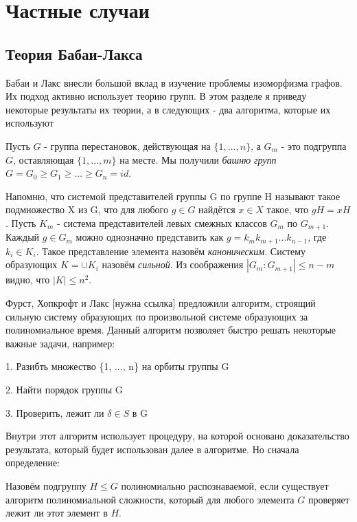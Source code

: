 \section{Частные случаи}





\subsection{Теория Бабаи-Лакса}
Бабаи и Лакс внесли большой вклад в изучение проблемы изоморфизма графов. Их подход активно использует теорию групп. В этом разделе я приведу некоторые результаты их теории, а в следующих - два алгоритма, которые их используют

Пусть $G$ - группа перестановок, действующая на $\{1, ..., n\}$, а $G_m$ - это подгруппа $G$, оставляющая $\{1, ..., m\}$ на месте. Мы получили \textit{башню групп} 
$G = G_0 \geqslant G_1 \geqslant ... \geqslant G_n = id$.

Напомню, что системой представителей группы G по группе H называют такое подмножество X из G, что для любого $g \in G$ найдётся $x \in X$ такое, что $gH = xH$. Пусть $K_m$ - система представителей левых смежных классов $G_m$ по $G_{m+1}$. Каждый $g \in G_m$ можно однозначно представить как $g = k_m k_{m + 1} ... k_{n - 1}$, где $k_i \in K_i$. Такое представление элемента назовём \textit{каноническим}. Систему образующих $K = \cup K_i$ назовём \textit{сильной}. Из соображения $|G_m : G_{m + 1}| \leqslant n - m$ видно, что $|K| \leqslant n^2$. 

Фурст, Хопкрофт и Лакс [нужна ссылка] предложили алгоритм, строящий сильную систему образующих по произвольной системе образующих за полиномиальное время. Данный алгоритм позволяет быстро решать некоторые важные задачи, например:

1. Разибть множество \{1, ..., n\} на орбиты группы G

2. Найти порядок группы G

3. Проверить, лежит ли $\delta \in S$ в G

Внутри этот алгоритм использует процедуру, на которой основано доказательство результата, который будет использован далее в алгоритме. Но сначала определение:

\begin{definition}
    Назовём подгруппу $H \leqslant G$ полиномиально распознаваемой, если существует алгоритм полиномиальной сложности, который для любого элемента $G$ проверяет лежит ли этот элемент в $H$.    
\end{definition}


